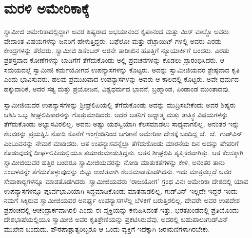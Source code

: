 
\chapter{ಮರಳಿ ಅಮೇರಿಕಾಕ್ಕೆ }

\vskip -10pt

 ಸ್ವಾಮೀಜಿ ಅಮೇರಿಕಾದಲ್ಲಿದ್ದಾಗ ಅವರ ಶಿಷ್ಯರಾದ ಅಭಯಾನಂದ ಕೃಪಾನಂದ ಮತ್ತು ಮಿಸ್ ವಾಲ್ಡೊ ಅವರು ವೇದಾಂತ ವಿಷಯಗಳನ್ನು ಜನರಿಗೆ ಹೇಳುತ್ತಿದ್ದರು. ಬಫೆಲೋ ಮತ್ತು ಡೆಟ್ರಾಯಿಟ್ ಗಳಲ್ಲಿ ಅವರು ಎರಡು ಕೇಂದ್ರಗಳನ್ನು ತೆರೆದರು. ಸ್ವಾಮೀಜಿ ಡಿಸೆಂಬರ್ ಆರನೇ ತಾರೀಖಿನ ಹೊತ್ತಿಗೆ ನ್ಯೂಯಾರ್ಕಿಗೆ ಬಂದರು. ಎರಡು ಪ್ರಶಸ್ತವಾದ ಕೋಣೆಗಳನ್ನು ಬಾಡಿಗೆಗೆ ತೆಗೆದುಕೊಂಡು ಅಲ್ಲಿ ಪ್ರವಚನಗಳನ್ನು ಕೊಡಲು ಪ್ರಾರಂಭಿಸಿದರು. ಆ ಸಮಯದಲ್ಲೆ ಸ್ವಾಮೀಜಿ ಕರ್ಮಯೋಗದ ಉಪನ್ಯಾಸಗಳನ್ನು ಕೊಟ್ಟರು. ಅದನ್ನು ಸ್ವಾಮೀಜಿಯವರ ಶ್ರೇಷ್ಠವಾದ ಕೃತಿ ಎಂದು ಭಾವಿಸುವರು. ಹಲವು ಪ್ರಮುಖವಾದ ಉಪನ್ಯಾಸಗಳನ್ನು ಅವರು ಆ ಕಾಲದಲ್ಲಿ ಕೊಟ್ಟರು. ಅವೇ ಧರ್ಮದ ಹಕ್ಕುದಾರಿಕೆ, ಅದರ ಸತ್ಯ ಮತ್ತು ಪ್ರಯೋಜನ, ವಿಶ್ವಧರ್ಮದ ಭಾವನೆ, ಬ್ರಹ್ಮಾಂಡ, ಪಿಂಡಾಂಡ ಮುಂತಾದವು. 

 ಸ್ವಾಮೀಜಿಯವರ ಉಪನ್ಯಾಸಗಳನ್ನು ಶ‍್ರೀಘ್ರಲಿಪಿಯಲ್ಲಿ ತೆಗೆದುಕೊಂಡು ಅದನ್ನು ಮುದ್ರಿಸಬೇಕೆಂದು ಅವರ ಶಿಷ್ಯರು ಆಶಿಸಿ ಒಬ್ಬ ಶೀಘ್ರಲಿಪಿಕಾರನನ್ನು ಗೊತ್ತುಮಾಡಿದರು. ಆದರೆ ಆತನಿಗೆ ಅಧ್ಯಾತ್ಮ ಮತ್ತು ತಾತ್ತ್ವಿಕ ವಿಷಯಗಳನ್ನು ತೆಗೆದುಕೊಂಡು ಅಭ್ಯಾಸವಿರಲಿಲ್ಲ. ಅವನು ಅಷ್ಟು ಯಶಸ್ವಿಯಾಗಿ ಕೆಲಸಮಾಡಲು ಸಾಧ್ಯವಾಗಲಿಲ್ಲ. ಅನಂತರ ಇನ್ನು ಕೆಲವರನ್ನು ಪ್ರಯತ್ನಿಸಿ ನೋಡಿ ಕೊನೆಗೆ ಇಂಗ್ಲೆಂಡಿನಿಂದ ಆಗತಾನೆ ಅಮೇರಿಕಾ ದೇಶಕ್ಕೆ ಬಂದಿದ್ದ ಜೆ.~ಜೆ.~ಗುಡ್‍ವಿನ್ ಎಂಬುವನನ್ನು ನೇಮಕ ಮಾಡಿದರು. ಆತ ಉಪನ್ಯಾಸವನ್ನೆಲ್ಲಾ ತೆಗೆದುಕೊಂಡು ಮಾರನೆಯ ದಿನ ಅದನ್ನು ಪೇಪರಿಗೆ ಕೊಡುವುದಕ್ಕೆ ದೀರ್ಘಲಿಪಿಯಲ್ಲಿಯೂ ತಯಾರುಮಾಡುತ್ತಿದ್ದನು. ಆತನ ಶೀಘ್ರಲಿಪಿ ತೃಪ್ತಿಕರವಾಗಿತ್ತು. ಆತ ಕೆಲಸಕ್ಕಾಗಿ ಸ್ವಾಮೀಜಿಯವರ ಹತ್ತಿರ ಬಂದರೂ ಸ್ವಾಮೀಜಿಯವರನ್ನು ನೋಡಿ ಮಾತುಕತೆಗಳನ್ನು ಕೇಳಿ, ಅನಂತರ ತಾನು ಸಂಬಳವನ್ನೇ ತೆಗೆದುಕೊಳ್ಳುವುದನ್ನು ಬಿಟ್ಟು ಉಚಿತವಾಗಿ ಕೆಲಸಮಾಡತೊಡಗಿದನು. ಇದು ಮಾತ್ರವಲ್ಲದೆ ಅವರ ಸೇವಾಕಾರ‍್ಯಗಳನ್ನೂ ಮಾಡತೊಡಗಿದರು. ಸ್ವಾಮೀಜಿಯವರು ‘ರಾಜಯೋಗ’ ಗ್ರಂಥ ವಿನಃ ಅಮೇರಿಕಾ ದೇಶದಲ್ಲಿ ಯಾವ ಉಪನ್ಯಾಸಗಳನ್ನೂ ಪೂರ್ವಭಾವಿಯಾಗಿ ಸಿದ್ಧಮಾಡಿಕೊಂಡು ಮಾತನಾಡಲಿಲ್ಲ. ಗುಡ್‍ವಿನ್ ಇಲ್ಲದೇ ಇದ್ದರೆ ಇಂದು ನಮಗೆ ಸಿಕ್ಕಿರುವ ಸ್ವಾಮೀಜಿಯವರ ಅನರ್ಘ್ಯ ಉಪನ್ಯಾಸಗಳೆಲ್ಲ ಬೆಳಕಿಗೆ ಬರುತ್ತಿರಲಿಲ್ಲ. ದೇವರೇ ಅವರ ಉಪದೇಶ ಪ್ರಪಂಚದಲ್ಲಿ ಆಚಂದ್ರಾರ್ಕವಾಗಿರಲಿ ಎಂದು ಈ ವ್ಯಕ್ತಿಯನ್ನು ಕಳುಹಿಸಿದಂತೆ ಇತ್ತು. ಭರತಖಂಡದಲ್ಲಿ ಪ್ರತಿಯೊಂದು ದೇಶಭಾಷೆಯಲ್ಲಿಯೂ ಸ್ವಾಮೀಜಿ ಅವರ ಕೃತಿಶ್ರೇಣಿಯನ್ನು ಪ್ರಕಟಿಸಿರುವೆವು. ಅದರಲ್ಲಿ ಬಹುಪಾಲು\break ಗುಡ್‍ವಿನ್ ಮುಖೇನ ಬಂದುದು. ಪೌರಪಾಶ್ಚಾತ್ಯರಿಬ್ಬರೂ ಆ ಒಂದು ವ್ಯಕ್ತಿಗೆ ಇದಕ್ಕಾಗಿ ಚಿರಋಣಿಗಳಾಗಿರಬೇಕು. 

